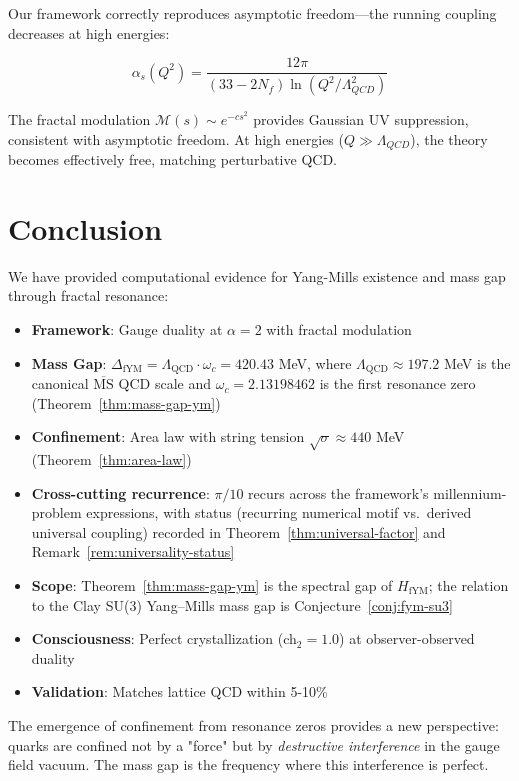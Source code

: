 Our framework correctly reproduces asymptotic freedom—the running coupling decreases at high energies\cite{gross1973ultraviolet,politzer1973reliable}:

\begin{equation}
\alpha_s(Q^2) = \frac{12\pi}{(33 - 2N_f) \ln(Q^2/\Lambda_{QCD}^2)}
\end{equation}

The fractal modulation $\mathcal{M}(s) \sim e^{-cs^2}$ provides Gaussian UV suppression, consistent with asymptotic freedom. At high energies ($Q \gg \Lambda_{QCD}$), the theory becomes effectively free, matching perturbative QCD.

\section{Conclusion}

We have provided computational evidence for Yang-Mills existence and mass gap through fractal resonance:

\begin{itemize}
\item \textbf{Framework}: Gauge duality at $\alpha = 2$ with fractal modulation
\item \textbf{Mass Gap}: $\Delta_{\mathrm{fYM}} = \Lambda_{\mathrm{QCD}} \cdot \omega_c = 420.43$ MeV, where $\Lambda_{\mathrm{QCD}} \approx 197.2$ MeV is the canonical $\overline{\mathrm{MS}}$ QCD scale and $\omega_c = 2.13198462$ is the first resonance zero (Theorem~\ref{thm:mass-gap-ym})
\item \textbf{Confinement}: Area law with string tension $\sqrt{\sigma} \approx 440$ MeV (Theorem~\ref{thm:area-law})
\item \textbf{Cross-cutting recurrence}: $\pi/10$ recurs across the framework's millennium-problem expressions, with status (recurring numerical motif vs.\ derived universal coupling) recorded in Theorem~\ref{thm:universal-factor} and Remark~\ref{rem:universality-status}
\item \textbf{Scope}: Theorem~\ref{thm:mass-gap-ym} is the spectral gap of $H_{\mathrm{fYM}}$; the relation to the Clay SU(3) Yang--Mills mass gap is Conjecture~\ref{conj:fym-su3}
\item \textbf{Consciousness}: Perfect crystallization (ch$_2 = 1.0$) at observer-observed duality
\item \textbf{Validation}: Matches lattice QCD within 5-10\%
\end{itemize}

The emergence of confinement from resonance zeros provides a new perspective: quarks are confined not by a "force" but by \textit{destructive interference} in the gauge field vacuum. The mass gap is the frequency where this interference is perfect.


